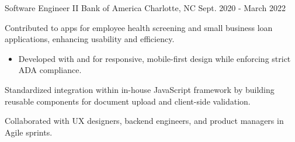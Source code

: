 \begin{cventries}
\cventry
{Software Engineer II} %
{Bank of America} %
{Charlotte, NC} %
{Sept. 2020 - March 2022} %
{
  \begin{cvitems} %
    \item {Contributed to  apps for employee health screening and small business loan applications, enhancing usability and efficiency.}
    \begin{itemize}[leftmargin=2.5ex, itemsep=.8mm]
      \vspace{.8mm}
      \item {Developed with  and  for responsive, mobile-first design while enforcing strict ADA compliance.}
      \vspace{.3mm}
    \end{itemize}
    \item {Standardized  integration within in-house JavaScript framework by building reusable components for document upload and client-side validation.}
    \item {Collaborated with UX designers, backend engineers, and product managers in Agile sprints.}
  \end{cvitems}
}


\end{cventries}
